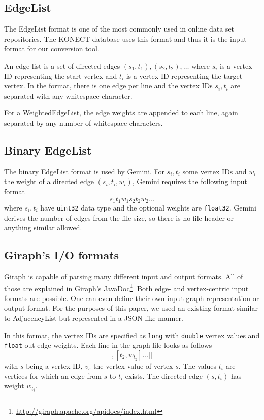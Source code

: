 \subsection{EdgeList}
The EdgeList format is one of the most commonly used in online data set repositories. The KONECT database uses this format and thus it is the input format for our conversion tool.

An edge list is a set of directed edges $(s_1,t_1),(s_2,t_2),\ldots$ where $s_i$ is a vertex ID representing the start vertex and $t_i$ is a vertex ID representing the target vertex.
In the format, there is one edge per line and the vertex IDs $s_i, t_i$ are separated with any whitespace character.

For a WeightedEdgeList, the edge weights are appended to each line, again separated by any number of whitespace characters.

\subsection{Binary EdgeList}
The binary EdgeList format is used by Gemini.
For $s_i, t_i$ some vertex IDs and $w_i$ the weight of a directed edge $(s_i,t_i, w_i)$, Gemini requires the following input format
\begin{equation*}
	s_1t_1w_1s_2t_2w_2\ldots
\end{equation*}
where $s_i,t_i$ have \texttt{uint32} data type and the optional weights are \texttt{float32}.
Gemini derives the number of edges from the file size, so there is no file header or anything similar allowed.

\subsection{Giraph's I/O formats}
Giraph is capable of parsing many different input and output formats. All of those are explained in Giraph's JavaDoc\footnote{\url{http://giraph.apache.org/apidocs/index.html}}.
Both edge- and vertex-centric input formats are possible.
One can even define their own input graph representation or output format. For the purposes of this paper, we used an existing format similar to AdjacencyList but represented in a JSON-like manner.

In this format, the vertex IDs are specified as \texttt{long} with \texttt{double} vertex values and \texttt{float} out-edge weights.
Each line in the graph file looks as follows
\begin{equation*}
	[s,v_s,[[t_1, w_{t_1}], [t_2, w_{t_2}]...]]
\end{equation*}
with $s$ being a vertex ID, $v_s$ the vertex value of vertex $s$. The values $t_i$ are vertices for which an edge from $s$ to $t_i$ exists. The directed edge $(s,t_i)$ has weight $w_{t_i}$.
